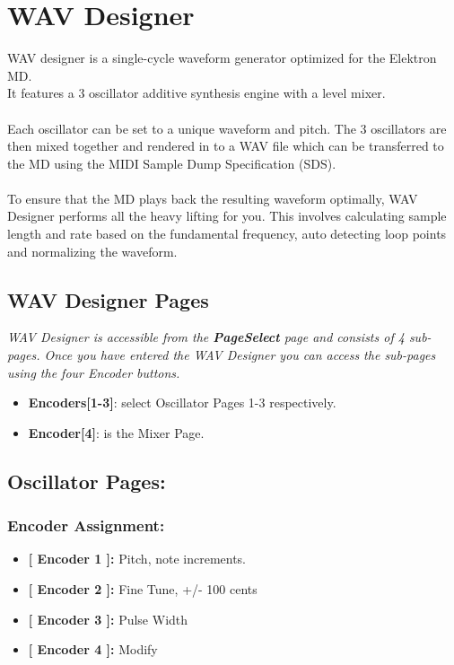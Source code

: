 \chapter{WAV Designer}
WAV designer is a single-cycle waveform generator optimized for the Elektron MD.\\
It features a 3 oscillator additive synthesis engine with a level mixer.\\
\\
Each oscillator can be set to a unique waveform and pitch. The 3 oscillators are then mixed together and rendered in to a WAV file which can be transferred to the MD using the MIDI Sample Dump Specification (SDS).\\
\\
To ensure that the MD plays back the resulting waveform optimally, WAV Designer performs all the heavy lifting for you. This involves calculating sample length and rate based on the fundamental frequency, auto detecting loop points and normalizing the waveform.
\section{WAV Designer Pages}
\textit{WAV Designer is accessible from the \textbf{PageSelect} page and consists of 4 sub-pages. Once you have entered the WAV Designer you can access the sub-pages using the four Encoder buttons.}

\begin{itemize}
\item \textbf{Encoders[1-3]}: select Oscillator Pages 1-3 respectively.
\item \textbf{Encoder[4]}: is the Mixer Page.
\end{itemize}

\section{Oscillator Pages:}
\subsection{Encoder Assignment:}
\begin{itemize}
	\item \textbf{[ Encoder 1 ]: } Pitch, note increments.
	\item \textbf{[ Encoder 2 ]: } Fine Tune, +/- 100 cents
	\item \textbf{[ Encoder 3 ]: } Pulse Width
	\item \textbf{[ Encoder 4 ]: } Modify
\end{itemize}
